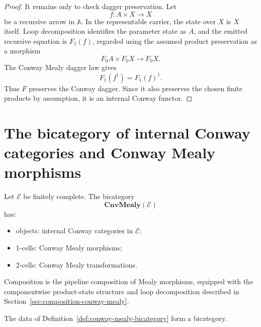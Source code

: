 \begin{proof}
It remains only to check dagger preservation.  Let
\[
f:A\times X\to X
\]
be a recursive arrow in \(\mathbb A\).  In the representable carrier, the
state over \(X\) is \(X\) itself.  Loop decomposition identifies the parameter
state as \(A\), and the emitted recursive equation is \(F_1(f)\), regarded
using the assumed product preservation as a morphism
\[
F_0A\times F_0X\to F_0X.
\]
The Conway Mealy dagger law gives
\[
F_1(f^\dagger)=F_1(f)^\dagger.
\]
Thus \(F\) preserves the Conway dagger.  Since it also preserves the chosen
finite products by assumption, it is an internal Conway functor.
\end{proof}

\section{The bicategory of internal Conway categories and Conway Mealy morphisms}
\label{sec:bicategory-internal-conway-mealy}

\begin{definition}
\label{def:conway-mealy-bicategory}
Let \(\mathcal E\) be finitely complete.  The bicategory
\[
\mathbf{CnvMealy}(\mathcal E)
\]
has:
\begin{itemize}
\item objects: internal Conway categories in \(\mathcal E\);
\item 1-cells: Conway Mealy morphisms;
\item 2-cells: Conway Mealy transformations.
\end{itemize}
Composition is the pipeline composition of Mealy morphisms, equipped with the
componentwise product-state structure and loop decomposition described in
Section~\ref{sec:composition-conway-mealy}.
\end{definition}

\begin{proposition}
\label{prop:cnvmealy-is-bicategory}
The data of Definition~\ref{def:conway-mealy-bicategory} form a bicategory.
\end{proposition}

